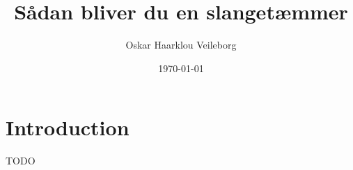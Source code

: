 

\title{Sådan bliver du en slangetæmmer}
\date{\today}
\author{Oskar Haarklou Veileborg}



\maketitle

\section{Introduction}

TODO



